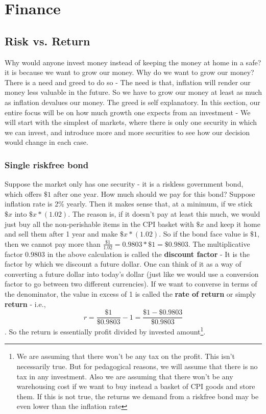 \chapter{Finance}
\section{Risk vs. Return}
Why would anyone invest money instead of keeping the money at home in a safe? it is because we want to grow our money. Why do we want to grow our money? There is a need and greed to do so - The need is that, inflation will render our money less valuable in the future. So we have to grow our money at least as much as inflation devalues our money. The greed is self explanatory. In this section, our entire focus will be on how much growth one expects from an investment - We will start with the simplest of markets, where there is only one security in which we can invest, and introduce more and more securities to see how our decision would change in each case.

\subsection{Single riskfree bond}
Suppose the market only has one security - it is a riskless government bond, which offers \(\$1\) after one year. How much should we pay for this bond? Suppose inflation rate is 2\% yearly. Then it makes sense that, at a minimum, if we stick \(\$x\) into \(\$x*(1.02)\). The reason is, if it doesn't pay at least this much, we would just buy all the non-perishable items in the CPI basket with \(\$x\) and keep it home and sell them after 1 year and make \(\$x*(1.02)\). So if the bond face value is \(\$1\), then we cannot pay more than \(\frac{\$1}{1.02} = 0.9803*\$1 = \$0.9803\). The multiplicative factor \(0.9803\) in the above calculation is called the \textbf{discount factor} - It is the factor by which we discount a future dollar. One can think of it as a way of converting a future dollar into today's dollar (just like we would use a conversion factor to go between two different currencies). If we want to converse in terms of the denominator, the value in excess of 1 is called the \textbf{rate of return} or simply \textbf{return} - i.e., \[r = \frac{\$1}{\$0.9803} - 1 = \frac{\$1 - \$0.9803}{\$0.9803}\]. So the return is essentially profit divided by invested amount\footnote{We are assuming that there won't be any tax on the profit. This isn't necessarily true. But for pedagogical reasons, we will assume that there is no tax in any investment. Also we are assuming that there won't be any warehousing cost if we want to buy instead a basket of CPI goods and store them. If this is not true, the returns we demand from a riskfree bond may be even lower than the inflation rate}. 

